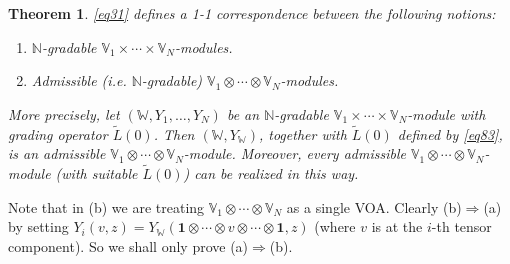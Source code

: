 \documentclass[11pt,b5paper,notitlepage]{article}
\theoremstyle{definition}
\newtheorem{rem}[df]{Remark}
\theoremstyle{plain}
\newtheorem{thm}[df]{Theorem}
\newtheorem{co}[df]{Corollary}
\newcommand{\wtd}{\widetilde}
\newcommand{\idt}{\mathbf{1}}
\newcommand{\Vbb}{\mathbb V}
\newcommand{\Wbb}{\mathbb W}
\newcommand{\Nbb}{\mathbb N}
\newcommand{\<}{\left\langle}
\renewcommand{\>}{\right\rangle}
\numberwithin{equation}{section}
\begin{document}
\begin{thm}\label{lb37}
\eqref{eq31} defines a 1-1 correspondence between the following notions:
\begin{enumerate}[label=(\alph*)]
\item $\Nbb$-gradable $\Vbb_1\times\cdots\times\Vbb_N$-modules.
\item Admissible (i.e. $\Nbb$-gradable) $\Vbb_1\otimes\cdots\otimes\Vbb_N$-modules.
\end{enumerate}
More precisely, let $(\Wbb,Y_1,\dots,Y_N)$ be an $\Nbb$-gradable $\Vbb_1\times\cdots\times\Vbb_N$-module with grading operator $\wtd L(0)$. Then $(\Wbb,Y_\Wbb)$, together with $\wtd L(0)$ defined by \eqref{eq83}, is an admissible $\Vbb_1\otimes \cdots \otimes \Vbb_N$-module. Moreover, every admissible $\Vbb_1\otimes \cdots \otimes \Vbb_N$-module (with suitable $\wtd L(0)$) can be realized in this way.
\end{thm}

Note that in (b) we are treating $\Vbb_1\otimes\cdots\otimes\Vbb_N$ as a single VOA. Clearly (b)$\Rightarrow$(a) by  setting $Y_i(v,z)=Y_\Wbb(\idt\otimes\cdots\otimes v\otimes\cdots\otimes\idt,z)$ (where $v$ is at the $i$-th tensor component). So we shall only prove (a)$\Rightarrow$(b). 

\end{document}
